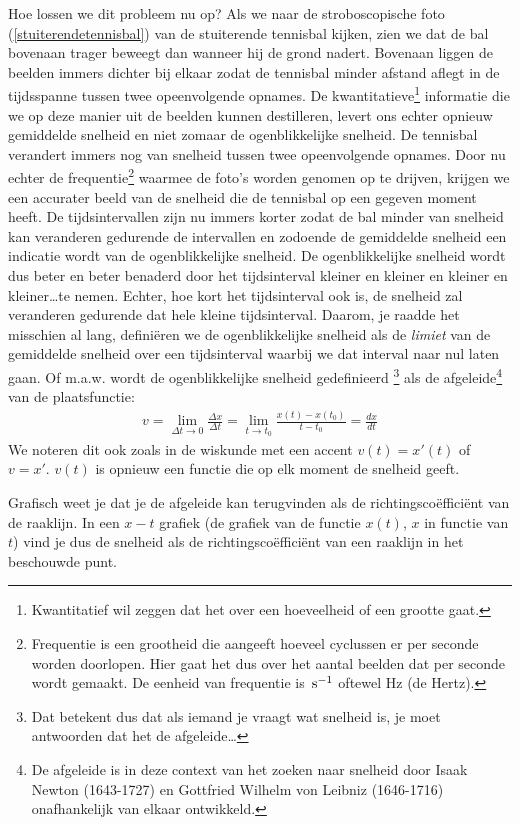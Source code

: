 \documentclass{ximera}
\begin{document}
	Hoe lossen we dit probleem nu op? Als we naar de stroboscopische foto (\ref{stuiterendetennisbal}) van de stuiterende tennisbal kij\-ken, zien we dat de bal bovenaan trager beweegt dan wanneer hij de grond nadert. Bovenaan liggen de beelden immers dichter bij elkaar zodat de tennisbal minder afstand aflegt in de tijdsspanne tussen twee opeenvolgende opnames. 
	De kwantitatieve\footnote{Kwantitatief wil zeggen dat het over een hoeveelheid of een grootte gaat.} informatie die we op deze manier uit de beelden kunnen destilleren, levert ons echter opnieuw gemiddelde snelheid en niet zomaar de ogenblikkelijke snelheid. De tennisbal verandert immers nog van snelheid tussen twee opeenvolgende opnames. Door nu echter de frequentie\footnote{Frequentie is een grootheid die aangeeft hoeveel cyclussen er per seconde worden doorlopen. Hier gaat het dus over het aantal beelden dat per seconde wordt gemaakt. De eenheid van frequentie is $\rm\,s^{-1}$ oftewel Hz (de Hertz).} waarmee de foto's worden genomen op te drijven, krijgen we een accurater beeld van de snelheid die de tennisbal op een gegeven moment heeft. De tijdsintervallen zijn nu immers korter zodat de bal minder van snelheid kan veranderen gedurende de intervallen en zodoende de gemiddelde snelheid een indicatie wordt van de ogenblikkelijke snelheid. De ogenblikkelijke snelheid wordt dus beter en beter benaderd door het tijdsinterval kleiner en kleiner en kleiner en kleiner\ldots te nemen. Echter, hoe kort het tijdsinterval ook is, de snelheid zal veranderen gedurende dat hele kleine tijdsinterval. Daarom, je raadde het misschien al lang, defini\"eren we de ogenblikkelijke snelheid als de \emph{limiet} van de gemiddelde snelheid over een tijdsinterval waarbij we dat interval naar nul laten gaan. Of m.a.w. wordt de ogenblikkelijke snelheid gedefinieerd \footnote{Dat betekent dus dat als iemand je vraagt wat snelheid is, je moet antwoorden dat het de afgeleide\ldots} als de afgeleide\footnote{De afgeleide is in deze context van het zoeken naar snelheid door Isaak Newton (1643-1727) en Gottfried Wilhelm von Leibniz (1646-1716) onafhankelijk van elkaar ontwikkeld.} van de plaatsfunctie:
	\begin{eqnarray*}
	v=\lim_{\Delta t\to 0}\frac{\Delta x}{\Delta t}=\lim_{t\to t_0}\frac{x(t)-x(t_0)}{t-t_0}=\frac{dx}{dt}
	\end{eqnarray*}
	We noteren dit ook zoals in de wiskunde met een accent $v(t)=x'(t)$ of $v=x'$. $v(t)$ is opnieuw een functie die op elk moment de snelheid geeft. 
	
	Grafisch weet je dat je de afgeleide kan terugvinden als de richtingsco\"effici\"ent van de raaklijn. In een $x-t$ grafiek (de grafiek van de functie $x(t)$, $x$ in functie van $t$) vind je dus de snelheid als de richtingsco\"effici\"ent van een raaklijn in het beschouwde punt. 
	
\end{document}
